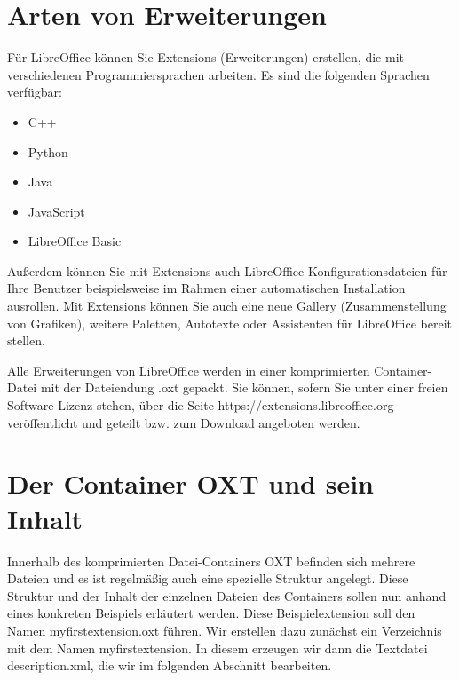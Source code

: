 \documentclass[12pt,a4paper,titlepage]{book}
\begin{document}
\chapter{Arten von Erweiterungen}
Für LibreOffice können Sie Extensions (Erweiterungen) erstellen, die mit verschiedenen Programmiersprachen arbeiten. Es sind die folgenden Sprachen verfügbar:
\begin{itemize}
	\item C++
	\item Python
	\item Java
	\item JavaScript
	\item LibreOffice Basic
\end{itemize}
Außerdem können Sie mit Extensions auch LibreOffice-Konfigurationsdateien für Ihre Benutzer beispielsweise im Rahmen einer automatischen Installation ausrollen. Mit Extensions können Sie auch eine neue Gallery (Zusammenstellung von Grafiken), weitere Paletten, Autotexte oder Assistenten für LibreOffice bereit stellen.

Alle Erweiterungen von LibreOffice werden in einer komprimierten Container-Datei mit der Dateiendung .oxt gepackt. Sie können, sofern Sie unter einer freien Software-Lizenz stehen, über die Seite https://extensions.libreoffice.org veröffentlicht und geteilt bzw. zum Download angeboten werden.

\chapter{Der Container OXT und sein Inhalt}\label{oxtcontainerinhalt}
Innerhalb des komprimierten Datei-Containers OXT befinden sich mehrere Dateien und es ist regelmäßig auch eine spezielle Struktur angelegt. Diese Struktur und der Inhalt der einzelnen Dateien des Containers sollen nun anhand eines konkreten Beispiels erläutert werden. Diese Beispielextension soll den Namen myfirstextension.oxt führen. Wir erstellen dazu zunächst ein Verzeichnis mit dem Namen myfirstextension. In diesem erzeugen wir dann die Textdatei description.xml, die wir im folgenden Abschnitt bearbeiten.
\end{document}
